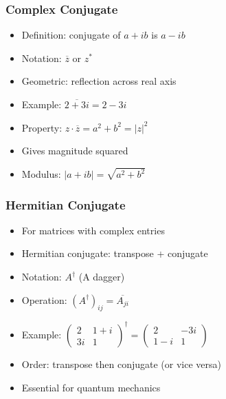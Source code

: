\begin{frame}[fragile]\frametitle{Complex Conjugate}
  \begin{itemize}
    \item Definition: conjugate of $a + ib$ is $a - ib$
    \item Notation: $\overline{z}$ or $z^*$
    \item Geometric: reflection across real axis
    \item Example: $\overline{2 + 3i} = 2 - 3i$
    \item Property: $z \cdot \overline{z} = a^2 + b^2 = |z|^2$
    \item Gives magnitude squared
    \item Modulus: $|a + ib| = \sqrt{a^2 + b^2}$
  \end{itemize}
\end{frame}

\begin{frame}[fragile]\frametitle{Hermitian Conjugate}
  \begin{itemize}
    \item For matrices with complex entries
    \item Hermitian conjugate: transpose + conjugate
    \item Notation: $A^\dagger$ (A dagger)
    \item Operation: $(A^\dagger)_{ij} = \overline{A_{ji}}$
    \item Example: $\begin{pmatrix} 2 & 1+i \\ 3i & 1 \end{pmatrix}^\dagger = \begin{pmatrix} 2 & -3i \\ 1-i & 1 \end{pmatrix}$
    \item Order: transpose then conjugate (or vice versa)
    \item Essential for quantum mechanics
  \end{itemize}
\end{frame}

